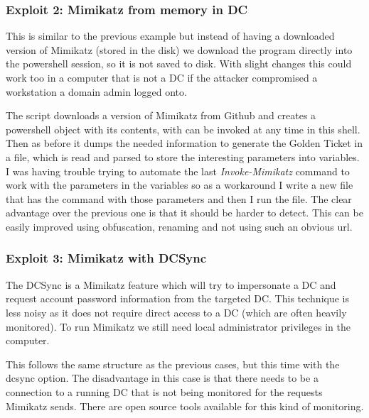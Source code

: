 \subsubsection{Exploit 2: Mimikatz from memory in DC}
This is similar to the previous example but instead of having a downloaded version of Mimikatz (stored in the disk) we download the program directly into the powershell session, so it is not saved to disk.
With slight changes this could work too in a computer that is not a DC if the attacker compromised a workstation a domain admin logged onto\cite{dump_ways}.
\linej

\linej
The script downloads a version of Mimikatz from Github and creates a powershell object with its contents, with can be invoked at any time in this shell\cite{powersploit}\cite{mimikatz_details}. Then as before it dumps the needed information to generate the Golden Ticket in a file, which is read and parsed to store the interesting parameters into variables.
\linej
I was having trouble trying to automate the last \textit{Invoke-Mimikatz} command to work with the parameters in the variables so as a workaround I write a new file that has the command with those parameters and then I run the file.
\linej
\linej
The clear advantage over the previous one is that it should be harder to detect. This can be easily improved using obfuscation, renaming and not using such an obvious url.

\subsubsection{Exploit 3: Mimikatz with DCSync}
The DCSync is a Mimikatz feature which will try to impersonate a DC and request account password information from the targeted DC. This technique is less noisy as it does not require direct access to a DC (which are often heavily monitored)\cite{dump_ways}\cite{pentestlab}. To run Mimikatz we still need local administrator privileges in the computer.
\linej

\linej
This follows the same structure as the previous cases, but this time with the dcsync option.
\linej
\linej
The disadvantage in this case is that there needs to be a connection to a running DC that is not being monitored for the requests Mimikatz sends. There are open source tools available for this kind of monitoring\cite{dcsync_monitor}.

